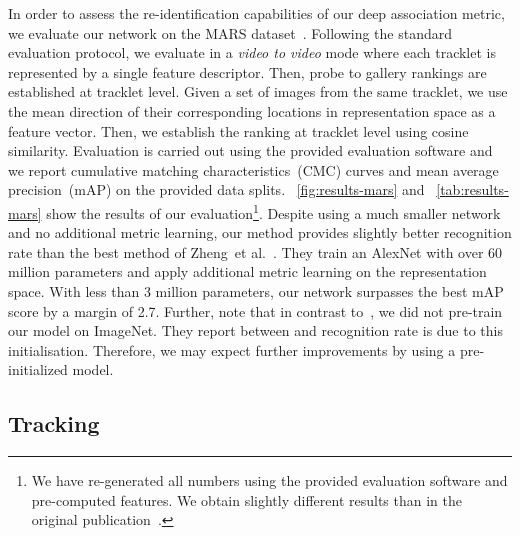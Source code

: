 \documentclass{article}
\newcommand{\etal}{et al.}
\begin{document}
In order to assess the re-identification capabilities of our deep association
metric, we evaluate our network on the MARS dataset~\cite{Zheng2016}.
Following the standard evaluation protocol, we evaluate in a
\textit{video to video} mode where each tracklet is represented by a single
feature descriptor.
Then, probe to gallery rankings are established at tracklet level.
Given a set of images from the same tracklet, we use the mean direction of
their corresponding locations in representation space as a feature vector.
Then, we establish the ranking at tracklet level using cosine similarity.
Evaluation is carried out using the  provided evaluation software and we report
cumulative matching characteristics~(CMC) curves and mean average
precision~(mAP) on the provided data splits.
\figurename~\ref{fig:results-mars} and \tablename~\ref{tab:results-mars}
show the results of our evaluation\footnote{We have re-generated all numbers using the provided evaluation software and
pre-computed features. We obtain slightly different results than in
the original publication~\cite{Zheng2016}.}.
Despite using a much smaller network and no additional metric learning, our
method provides slightly better recognition rate than the best method
of Zheng~\etal~\cite{Zheng2016}.
They train an AlexNet with over 60 million parameters and apply additional
metric learning on the representation space.
With less than 3 million parameters, our network surpasses the best
mAP score by a margin of 2.7.
Further, note that in contrast to~\cite{Zheng2016}, we did not pre-train our
model on ImageNet.
They report between  and  recognition rate is due to this
initialisation.
Therefore, we may expect further improvements by using a pre-initialized model.

\subsection{Tracking}
\fi
\end{document}
